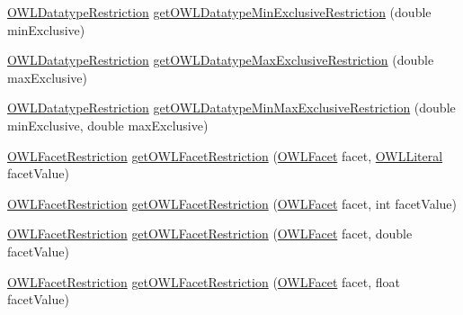 \begin{DoxyCompactItemize}
\item 
\hyperlink{interfaceorg_1_1semanticweb_1_1owlapi_1_1model_1_1_o_w_l_datatype_restriction}{O\-W\-L\-Datatype\-Restriction} \hyperlink{interfaceorg_1_1semanticweb_1_1owlapi_1_1model_1_1_o_w_l_data_factory_aca8245961f497e7a045323aee4333ad3}{get\-O\-W\-L\-Datatype\-Min\-Exclusive\-Restriction} (double min\-Exclusive)
\item 
\hyperlink{interfaceorg_1_1semanticweb_1_1owlapi_1_1model_1_1_o_w_l_datatype_restriction}{O\-W\-L\-Datatype\-Restriction} \hyperlink{interfaceorg_1_1semanticweb_1_1owlapi_1_1model_1_1_o_w_l_data_factory_aa4d1f2ff3a804b6d6aa2a32166edbcc4}{get\-O\-W\-L\-Datatype\-Max\-Exclusive\-Restriction} (double max\-Exclusive)
\item 
\hyperlink{interfaceorg_1_1semanticweb_1_1owlapi_1_1model_1_1_o_w_l_datatype_restriction}{O\-W\-L\-Datatype\-Restriction} \hyperlink{interfaceorg_1_1semanticweb_1_1owlapi_1_1model_1_1_o_w_l_data_factory_ad4fe198080aa4d6e2516a779ed901f5c}{get\-O\-W\-L\-Datatype\-Min\-Max\-Exclusive\-Restriction} (double min\-Exclusive, double max\-Exclusive)
\item 
\hyperlink{interfaceorg_1_1semanticweb_1_1owlapi_1_1model_1_1_o_w_l_facet_restriction}{O\-W\-L\-Facet\-Restriction} \hyperlink{interfaceorg_1_1semanticweb_1_1owlapi_1_1model_1_1_o_w_l_data_factory_a391f6aedc8e2d17467155227d82f5a34}{get\-O\-W\-L\-Facet\-Restriction} (\hyperlink{enumorg_1_1semanticweb_1_1owlapi_1_1vocab_1_1_o_w_l_facet}{O\-W\-L\-Facet} facet, \hyperlink{interfaceorg_1_1semanticweb_1_1owlapi_1_1model_1_1_o_w_l_literal}{O\-W\-L\-Literal} facet\-Value)
\item 
\hyperlink{interfaceorg_1_1semanticweb_1_1owlapi_1_1model_1_1_o_w_l_facet_restriction}{O\-W\-L\-Facet\-Restriction} \hyperlink{interfaceorg_1_1semanticweb_1_1owlapi_1_1model_1_1_o_w_l_data_factory_a009c6f2cad986633c8bebeee8cece0cc}{get\-O\-W\-L\-Facet\-Restriction} (\hyperlink{enumorg_1_1semanticweb_1_1owlapi_1_1vocab_1_1_o_w_l_facet}{O\-W\-L\-Facet} facet, int facet\-Value)
\item 
\hyperlink{interfaceorg_1_1semanticweb_1_1owlapi_1_1model_1_1_o_w_l_facet_restriction}{O\-W\-L\-Facet\-Restriction} \hyperlink{interfaceorg_1_1semanticweb_1_1owlapi_1_1model_1_1_o_w_l_data_factory_aa35c88a5b1cc3dc7fc73fb955a93e00e}{get\-O\-W\-L\-Facet\-Restriction} (\hyperlink{enumorg_1_1semanticweb_1_1owlapi_1_1vocab_1_1_o_w_l_facet}{O\-W\-L\-Facet} facet, double facet\-Value)
\item 
\hyperlink{interfaceorg_1_1semanticweb_1_1owlapi_1_1model_1_1_o_w_l_facet_restriction}{O\-W\-L\-Facet\-Restriction} \hyperlink{interfaceorg_1_1semanticweb_1_1owlapi_1_1model_1_1_o_w_l_data_factory_a8240937adc39f91e9010791c394f6a3f}{get\-O\-W\-L\-Facet\-Restriction} (\hyperlink{enumorg_1_1semanticweb_1_1owlapi_1_1vocab_1_1_o_w_l_facet}{O\-W\-L\-Facet} facet, float facet\-Value)

\end{DoxyCompactItemize}
